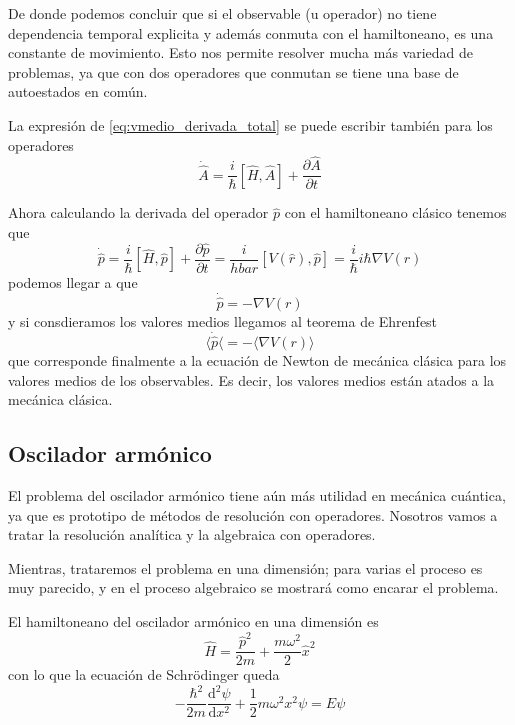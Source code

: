 De donde podemos concluir que si el observable (u operador) no tiene dependencia temporal explicita y además conmuta con el hamiltoneano, es una constante de movimiento.
Esto nos permite resolver mucha más variedad de problemas, ya que con dos operadores que conmutan se tiene una base de autoestados en común.

La expresión de \ref{eq:vmedio_derivada_total} se puede escribir también para los operadores
\begin{equation}
    \dot{\hat{A}} = \frac{i}{\hbar} [\hat{H},\hat{A}] + \frac{\partial \hat{A}}{\partial t}
    \label{eq:operador_derivada_total}
\end{equation}

Ahora calculando la derivada del operador $\hat{p}$ con el hamiltoneano clásico tenemos que
\[ \dot{\hat{p}} = \frac{i}{\hbar} [\hat{H}, \hat{p}] + \frac{\partial \hat{p}}{\partial t} = \frac{i}{hbar} [V(\hat{r}), \hat{p}] = \frac{i}{\hbar} i \hbar \nabla V(r)\]
podemos llegar a que 
\begin{equation}
    \dot{\hat{p}} = -\nabla V(r)
    \label{eq:operador_newton}
\end{equation}
y si consdieramos los valores medios llegamos al teorema de Ehrenfest
\begin{equation}
    \langle \dot{\hat{p}} \langle = - \langle \nabla V(r) \rangle
    \label{eq:ehrenfest}
\end{equation}
que corresponde finalmente a la ecuación de Newton de mecánica clásica para los valores medios de los observables.
Es decir, los valores medios están atados a la mecánica clásica.

\subsection{Oscilador armónico}
El problema del oscilador armónico tiene aún más utilidad en mecánica cuántica, ya que es prototipo de métodos de resolución con operadores.
Nosotros vamos a tratar la resolución analítica y la algebraica con operadores.

Mientras, trataremos el problema en una dimensión; para varias el proceso es muy parecido, y en el proceso algebraico se mostrará como encarar el problema.

El hamiltoneano del oscilador armónico en una dimensión es
\begin{equation}
\hat{H} = \frac{\hat{p}^2}{2m} + \frac{m \omega^2}{2} \hat{x}^2
\end{equation}
con lo que la ecuación de Schrödinger queda
\begin{equation}
    -\frac{\hbar^2}{2m} \frac{\mathrm{d}^2\psi}{\mathrm{d}x^2} + \frac{1}{2} m \omega^2 x^2 \psi = E \psi
    \label{eq:schrodinger_armonico}
\end{equation}

